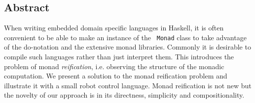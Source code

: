 \subsection*{Abstract}
When writing embedded domain specific languages in Haskell, it is
often convenient to be able to make an instance of the {\tt
Monad} class to take advantage of the do-notation and the extensive
monad libraries. Commonly it is desirable to compile such languages 
rather than just interpret them.
This introduces the problem of monad {\em reification}, i.e. observing 
the structure of the monadic computation.
We present a solution to the monad reification problem and
illustrate it with a small robot control language.
Monad reification is not new but the novelty
of our approach is in its directness, simplicity and compositionality.



%


